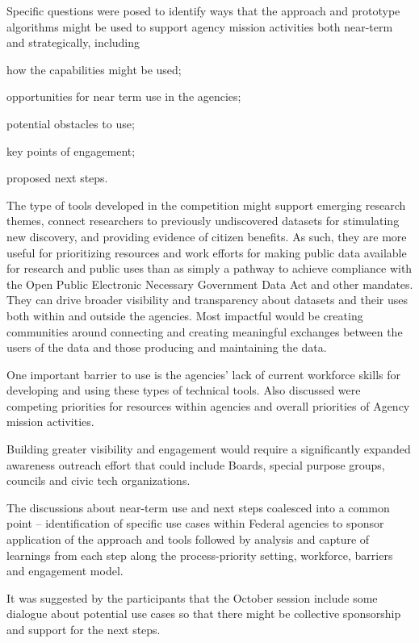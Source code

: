 \documentclass[titlepage, 11pt]{article}
\begin{document}
{Specific questions were posed to identify ways that the approach and prototype algorithms might be used to support agency mission activities both near-term and strategically, including \begin{enumerate*}[label=(\arabic*)]
    \item how the capabilities might be used;
    \item opportunities for near term use in the agencies; 
    \item potential obstacles to use; 
    \item key points of engagement; 
    \item proposed next steps.
\end{enumerate*}

The type of tools developed in the competition might support emerging research themes, connect researchers to previously undiscovered datasets for stimulating new discovery, and providing evidence of citizen benefits. As such, they are more useful for prioritizing resources and work efforts for making public data available for research and public uses than as simply a pathway to achieve compliance with the Open Public Electronic Necessary Government Data Act and other mandates. They can drive broader visibility and transparency about datasets and their uses both within and outside the agencies. Most impactful would be creating communities around connecting and creating meaningful exchanges between the users of the data and those producing and maintaining the data. 

One important barrier to use is the agencies’ lack of current workforce skills for developing and using these types of technical tools.   Also discussed were competing priorities for resources within agencies and overall priorities of Agency mission activities. 

Building greater visibility and engagement would require a significantly expanded awareness outreach effort that could include Boards, special purpose groups, councils and civic tech organizations.

The discussions about near-term use and next steps coalesced into a common point – identification of specific use cases within Federal agencies to sponsor application of the approach and tools followed by analysis and capture of learnings from each step along the process-priority setting, workforce, barriers and engagement model.

It was suggested by the participants that the October session include some dialogue about potential use cases so that there might be collective sponsorship and support for the next steps. 

}
\end{document}
